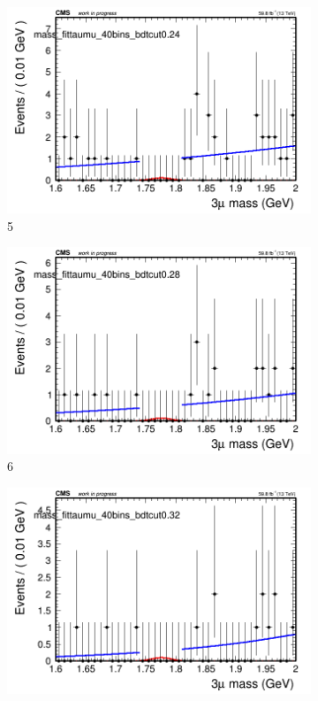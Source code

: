 \begin{figure}[h!]
\begin{subfigure}{0.2\textwidth}
        \includegraphics[width=\textwidth]{power_law/plots/taumu/massfit_taumu_40bins_bdtcut0.24.png}
        \caption{5}
    \end{subfigure}
    \begin{subfigure}{0.2\textwidth}
        \includegraphics[width=\textwidth]{power_law/plots/taumu/massfit_taumu_40bins_bdtcut0.28.png}
        \caption{6}
    \end{subfigure}
    \begin{subfigure}{0.2\textwidth}
        \includegraphics[width=\textwidth]{power_law/plots/taumu/massfit_taumu_40bins_bdtcut0.32.png}

\end{subfigure}
\end{figure}
